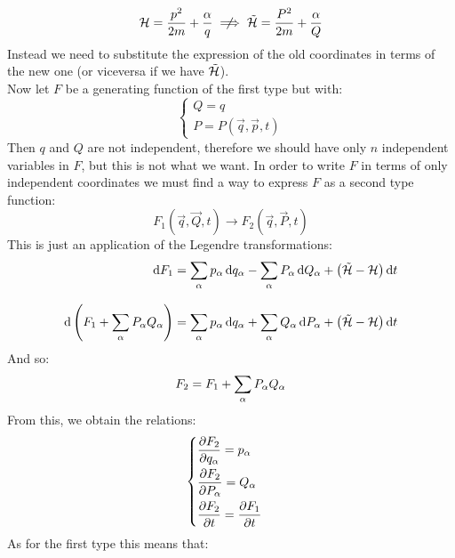 \begin{equation}
    \hamfun = \dfrac{p^2}{2m} + \dfrac{\alpha}{q} \notimplies \tilde{\hamfun} = \dfrac{P^2}{2m} + \dfrac{\alpha}{Q}
\end{equation}
Instead we need to substitute the expression of the old coordinates in terms of the new one (or viceversa if we have $\tilde{\mathcal{H}}$).\\
Now let $F$ be a generating function of the first type but with:
\begin{equation}
    \begin{cases}
        Q = q\\[8pt]
        P = P(\vec{q},\vec{p},t)
    \end{cases}
\end{equation}
Then $q$ and $Q$ are not independent, therefore we should have only $n$ independent variables in $F$, but this is not what we want. In order to write $F$ in terms of only independent coordinates we must find a way to express $F$ as a second type function:
\begin{equation}
    F_1(\vec{q},\vec{Q},t) \longrightarrow F_2(\vec{q},\vec{P},t)
\end{equation}
This is just an application of the Legendre transformations:
\begin{equation}
    \begin{split}
        \dd{F_1} &= \displaystyle\sum_{\alpha}p_{\alpha}\dd{q_{\alpha}} - \displaystyle\sum_{\alpha}P_{\alpha}\dd{Q_{\alpha}} + \left(\tilde{\mathcal{H}}- \mathcal{H}\right)\dd{t}\\[8pt]
        \dd{\left(F_1 + \displaystyle\sum_{\alpha}P_{\alpha}Q_{\alpha}\right)} &= \displaystyle\sum_{\alpha}p_{\alpha}\dd{q_{\alpha}}  + \displaystyle\sum_{\alpha}Q_{\alpha}\dd{P_{\alpha}} + \left(\tilde{\mathcal{H}}- \mathcal{H}\right)\dd{t}
    \end{split}
\end{equation}
And so:
\begin{equation}
    F_2 = F_1 + \displaystyle\sum_{\alpha}P_{\alpha}Q_{\alpha}
\end{equation}
From this, we obtain the relations:
\begin{equation}
    \begin{cases}
        \pdv{F_2}{q_{\alpha}} = p_{\alpha}\\[8pt]
        \pdv{F_2}{P_{\alpha}} = Q_{\alpha}\\[8pt]
        \pdv{F_2}{t} = \pdv{F_1}{t}
    \end{cases}
\end{equation}
As for the first type this means that:
